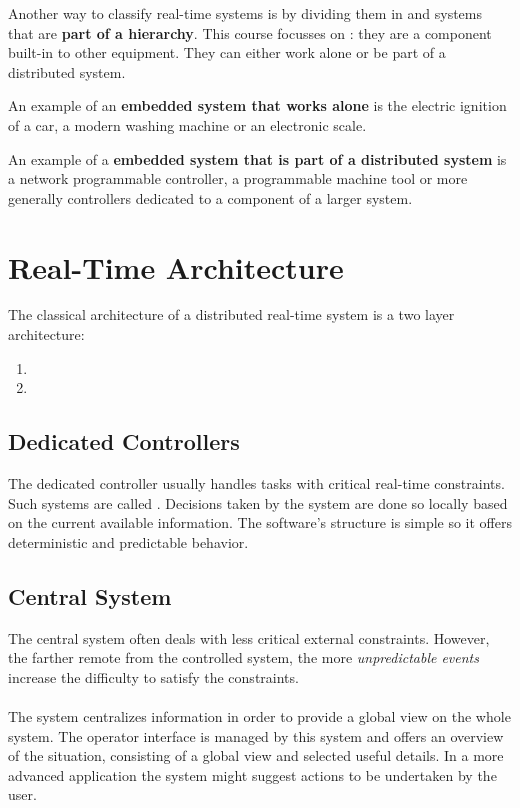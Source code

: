 \documentclass[../main.tex]{subfiles}
\begin{document}
Another way to classify real-time systems is by dividing them in  and systems that are \textbf{part of a hierarchy}. This course focusses on : they are a component built-in to other equipment. They can either work alone or be part of a distributed system.

\begin{exmp}
An example of an \textbf{embedded system that works alone} is the electric ignition of a car, a modern washing machine or an electronic scale.
\end{exmp} 

\begin{exmp}
An example of a \textbf{embedded system that is part of a distributed system} is a network programmable controller, a programmable machine tool or more generally controllers dedicated to a component of a larger system.
\end{exmp} 


\section{Real-Time Architecture}
The classical architecture of a distributed real-time system is a two layer architecture:
\begin{enumerate}
	\item {} 
	\item {}
\end{enumerate}

\subsection{Dedicated Controllers}
The dedicated controller usually handles tasks with critical real-time constraints. Such systems are called . Decisions taken by the system are done so locally based on the current available information. The software's structure is simple so it offers deterministic and predictable behavior. 
 
\subsection{Central System}
The central system often deals with less critical external constraints. However, the farther remote from the controlled system, the more \textit{unpredictable events} increase the difficulty to satisfy the constraints. 
\\\\
The system centralizes information in order to provide a global view on the whole system. The operator interface is managed by this system and offers an overview of the situation, consisting of a global view and selected useful details. In a more advanced application the system might suggest actions to be undertaken by the user.
\end{document}
